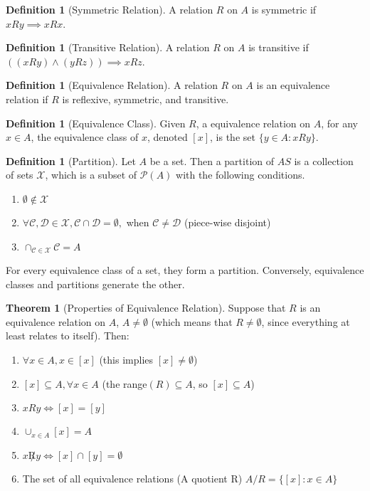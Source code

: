 \documentclass[10pt]{article}
\theoremstyle{definition}
\newtheorem{definition}[equation]{Definition}
\newtheorem{theorem}[equation]{Theorem}
\begin{document}
\begin{definition}[Symmetric Relation]
  A relation $R$ on $A$ is symmetric if $xRy\implies xRx$.
\end{definition}

\begin{definition}[Transitive Relation]
  A relation $R$ on $A$ is transitive if $((xRy)\land(yRz))\implies xRz$.
\end{definition}

\begin{definition}[Equivalence Relation]
  A relation $R$ on $A$ is an equivalence relation if $R$ is reflexive, symmetric, and transitive.
\end{definition}

\begin{definition}[Equivalence Class]
  Given $R$, a equivalence relation on $A$, for any $x\in A$, the equivalence class of $x$, denoted $[x]$, is the set $\{y\in A: xRy\}$.
\end{definition}

\begin{definition}[Partition]
  Let $A$ be a set. Then a partition of $AS$ is a collection of sets $\mathcal{X}$, which is a subset of $\mathcal{P}(A)$ with the following conditions.
  \begin{enumerate}
    \item $\emptyset\not\in\mathcal{X}$
    \item $\forall\mathcal{C,D}\in\mathcal{X}, \mathcal{C}\cap\mathcal{D}=\emptyset,$ when $\mathcal{C}\neq\mathcal{D}$ (piece-wise disjoint)
    \item $\cap_{\mathcal{C}\in\mathcal{X}} \mathcal{C} = A$
  \end{enumerate}

  For every equivalence class of a set, they form a partition. Conversely, equivalence classes and partitions generate the other.
\end{definition}

\begin{theorem}[Properties of Equivalence Relation]
  Suppose that $R$ is an equivalence relation on $A$, $A\neq\emptyset$ (which means that $R\neq\emptyset$, since everything at least relates to itself). Then:
  \begin{enumerate}
    \item $\forall x\in A, x\in[x]$ (this implies $[x]\neq \emptyset$)
    \item $[x] \subseteq A, \forall x\in A$ (the range$(R)\subseteq A$, so $[x]\subseteq A$)
    \item $xRy \iff [x]=[y]$
    \item $\cup_{x\in A} [x] = A$
    \item $x\not Ry \iff [x]\cap [y] = \emptyset$
    \item The set of all equivalence relations (A quotient R) $A/R = \{[x]:x\in A\}$
  \end{enumerate}
\end{theorem}
\end{document}
